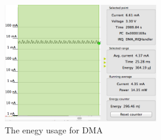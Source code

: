 \begin{figure}[H]
    \centering
    \includegraphics[width=250px]{figures/sw/fpga.png}
    \caption{The enegy usage for DMA}
    \label{fig:fpga}
\end{figure}
